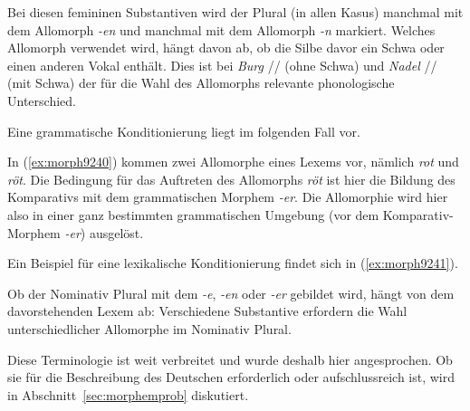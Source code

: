 
\begin{exe}
  \ex{\label{ex:morph9239}}
  \begin{xlist}
  \end{xlist}
\end{exe}

Bei diesen femininen Substantiven wird der Plural (in allen Kasus) manchmal mit dem Allomorph \textit{-en} und manchmal mit dem Allomorph \textit{-n} markiert.
Welches Allomorph verwendet wird, hängt davon ab, ob die Silbe davor ein Schwa oder einen anderen Vokal enthält.
Dies ist bei \textit{Burg} // (ohne Schwa) und \textit{Nadel} // (mit Schwa) der für die Wahl des Allomorphs relevante phonologische Unterschied.

Eine grammatische Konditionierung liegt im folgenden Fall vor.

\begin{exe}
  \ex \label{ex:morph9240}
  \begin{xlist}
  \end{xlist}
\end{exe}

In (\ref{ex:morph9240}) kommen zwei Allomorphe eines Lexems vor, nämlich \textit{rot} und \textit{röt}.
Die Bedingung für das Auftreten des Allomorphs \textit{röt} ist hier die Bildung des Komparativs mit dem grammatischen Morphem \textit{-er}.
Die Allomorphie wird hier also in einer ganz bestimmten grammatischen Umgebung (vor dem Komparativ-Morphem \textit{-er}) ausgelöst.

Ein Beispiel für eine lexikalische Konditionierung findet sich in (\ref{ex:morph9241}).

\begin{exe}
  \ex \label{ex:morph9241}
  \begin{xlist}
  \end{xlist}
\end{exe}

Ob der Nominativ Plural mit dem \textit{-e}, \textit{-en} oder \textit{-er} gebildet wird, hängt von dem davorstehenden Lexem ab:
Verschiedene Substantive erfordern die Wahl unterschiedlicher Allomorphe im Nominativ Plural.

Diese Terminologie ist weit verbreitet und wurde deshalb hier angesprochen.
Ob sie für die Beschreibung des Deutschen erforderlich oder aufschlussreich ist, wird in Abschnitt~\ref{sec:morphemprob} diskutiert.

